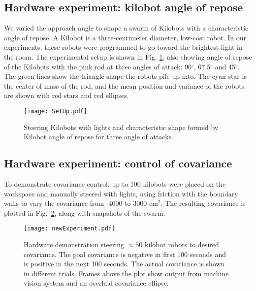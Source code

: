 \subsection{Hardware experiment: kilobot angle of repose}
We varied the approach angle to shape a swarm of Kilobots \cite{rubenstein2014programmable} with a characteristic angle of repose. 
 A Kilobot is a three-centimeter diameter,  low-cost robot. In our experiments, these robots were programmed to go toward the brightest light in the room. The experimental setup is shown in Fig. \ref{fig:SetUp}, also showing angle of repose of the Kilobots with  the pink rod at three angles of attack: 90$^\circ$, 67.5$^\circ$ and 45$^\circ$. The green lines show the triangle shape the robots pile up into. The cyan star is the center of mass of the rod, and the mean position and variance of the robots are shown with  red stars and red ellipses.
\begin{figure}
\begin{center}
	\texttt{[image: SetUp.pdf]}
\end{center}
\caption{\label{fig:SetUp}
Steering Kilobots with lights and characteristic shape formed by Kilobot angle of repose for three angle of attacks.
}
\end{figure}






\subsection{Hardware experiment: control of covariance}
To demonstrate covariance control, up to 100 kilobots were placed on the workspace and manually steered with lights, using friction with the boundary walls to vary the covariance from  -4000 to 3000 cm$^2$.  The resulting covariance is plotted in Fig.~\ref{fig:covExperiment}, along with snapshots of the swarm.




\begin{figure}
\begin{center}
	\texttt{[image: newExperiment.pdf]}
\end{center}
\caption{\label{fig:covExperiment}
Hardware demonstration steering $\approx 50$ kilobot robots to desired covariance. The goal covariance is negative in first 100 seconds and is positive in the next 100 seconds. The actual covariance is shown in different trials. Frames above the plot show output from machine vision system and an overlaid covariance ellipse.
}
\end{figure}

